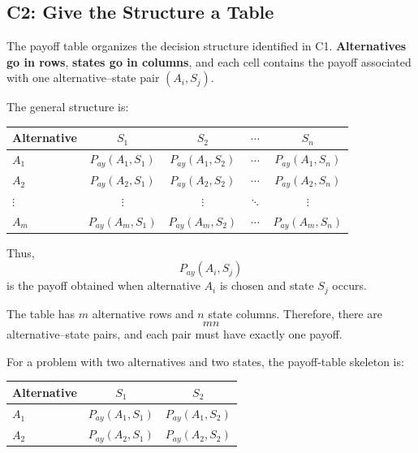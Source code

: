 	
	
	\subsection{C2: Give the Structure a Table}
	\label{sec:c2-payoff-table}
	
	The payoff table organizes the decision structure identified in C1.
	\textbf{Alternatives go in rows}, \textbf{states go in columns}, and each
	cell contains the payoff associated with one alternative--state pair
	\((A_i,S_j)\).
	
	The general structure is:
	\begin{center}
		\begin{tabular}{lcccc}
			\toprule
			Alternative
			& $S_1$
			& $S_2$
			& $\cdots$
			& $S_n$ \\
			\midrule
			$A_1$
			& $P_{ay}(A_1,S_1)$
			& $P_{ay}(A_1,S_2)$
			& $\cdots$
			& $P_{ay}(A_1,S_n)$ \\
			
			$A_2$
			& $P_{ay}(A_2,S_1)$
			& $P_{ay}(A_2,S_2)$
			& $\cdots$
			& $P_{ay}(A_2,S_n)$ \\
			
			$\vdots$
			& $\vdots$
			& $\vdots$
			& $\ddots$
			& $\vdots$ \\
			
			$A_m$
			& $P_{ay}(A_m,S_1)$
			& $P_{ay}(A_m,S_2)$
			& $\cdots$
			& $P_{ay}(A_m,S_n)$ \\
			\bottomrule
		\end{tabular}
	\end{center}
	
	Thus,
	\[
	P_{ay}(A_i,S_j)
	\]
	is the payoff obtained when alternative \(A_i\) is chosen and state
	\(S_j\) occurs.
	
	The table has \(m\) alternative rows and \(n\) state columns. Therefore,
	there are
	\[
	mn
	\]
	alternative--state pairs, and each pair must have exactly one payoff.
	
	For a problem with two alternatives and two states, the payoff-table
	skeleton is:
	\begin{center}
		\begin{tabular}{lcc}
			\toprule
			Alternative & $S_1$ & $S_2$ \\
			\midrule
			$A_1$ & $P_{ay}(A_1,S_1)$ & $P_{ay}(A_1,S_2)$ \\
			$A_2$ & $P_{ay}(A_2,S_1)$ & $P_{ay}(A_2,S_2)$ \\
			\bottomrule
		\end{tabular}
	\end{center}
	
